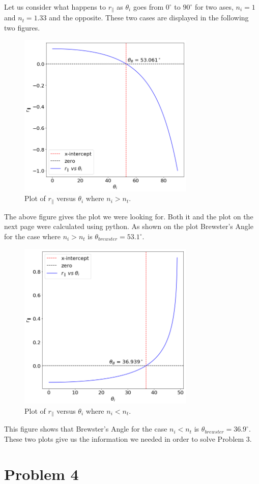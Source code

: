 \documentclass{article}
\begin{document}
	Let us consider what happens to $r_\parallel$ as $\theta_i$ goes from $0^\circ$ to $90^\circ$ for two ases, $n_i = 1$ and $n_t = 1.33$ and the 
	opposite. These two cases are displayed in the following two figures.
	
	\begin{figure}[!h]
		\centering
			\includegraphics[width=0.75\textwidth]{r-par-1.png}
			\caption{Plot of $r_\parallel$ versus $\theta_i$ where $n_i > n_t$.}
	\end{figure}

	The above figure gives the plot we were looking for. Both it and the plot on the next page were calculated using python. As shown on the plot
	Brewster's Angle for the case where $n_i > n_t$ is $\theta_{brewster} = 53.1^\circ$.

	\begin{figure}[!t]
		\centering
			\includegraphics[width=0.75\textwidth]{r-par-2.png}
			\caption{Plot of $r_\parallel$ versus $\theta_i$ where $n_i < n_t$.}
	\end{figure}
	
	\pagebreak
	This figure shows that Brewster's Angle for the case $n_i < n_t$ is $\theta_{brewster} = 36.9^\circ$.
	These two plots give us the information we needed in order to solve Problem 3.
	
	\pagebreak
	\section*{Problem 4}
	
	
	
\end{document}
